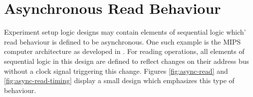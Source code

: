 \documentclass{article}
\begin{document}





\newpage
\section{Asynchronous Read Behaviour}
\label{section:async-read}
Experiment setup logic designs may contain elements of sequential logic which' read behaviour is defined to be asynchronous. One such example is the MIPS computer architecture as developed in \cite[Ch. 4]{hennessy2013computer}. For reading operations, all elements of sequential logic in this design are defined to reflect changes on their address bus without a clock signal triggering this change. Figures \ref{fig:async-read} and \ref{fig:async-read-timing} display a small design which emphasizes this type of behaviour.
\end{document}

